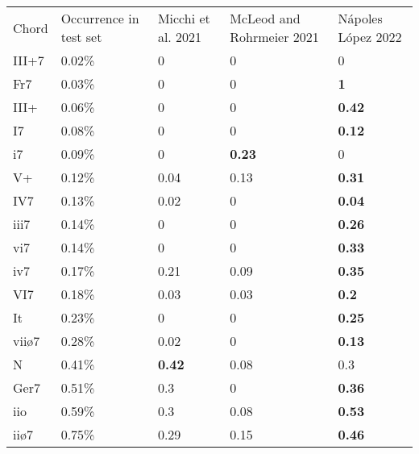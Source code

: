 \begin{tabular}{lllll}
Chord & Occurrence in test set & Micchi et al. 2021 & McLeod and Rohrmeier 2021 & Nápoles López 2022 \\
III+7 & 0.02\%                 & 0                  & 0                         & 0                  \\
Fr7   & 0.03\%                 & 0                  & 0                         & \textbf{1}         \\
III+  & 0.06\%                 & 0                  & 0                         & \textbf{0.42}      \\
I7    & 0.08\%                 & 0                  & 0                         & \textbf{0.12}      \\
i7    & 0.09\%                 & 0                  & \textbf{0.23}             & 0                  \\
V+    & 0.12\%                 & 0.04               & 0.13                      & \textbf{0.31}      \\
IV7   & 0.13\%                 & 0.02               & 0                         & \textbf{0.04}      \\
iii7  & 0.14\%                 & 0                  & 0                         & \textbf{0.26}      \\
vi7   & 0.14\%                 & 0                  & 0                         & \textbf{0.33}      \\
iv7   & 0.17\%                 & 0.21               & 0.09                      & \textbf{0.35}      \\
VI7   & 0.18\%                 & 0.03               & 0.03                      & \textbf{0.2}       \\
It    & 0.23\%                 & 0                  & 0                         & \textbf{0.25}      \\
viiø7 & 0.28\%                 & 0.02               & 0                         & \textbf{0.13}      \\
N     & 0.41\%                 & \textbf{0.42}      & 0.08                      & 0.3                \\
Ger7  & 0.51\%                 & 0.3                & 0                         & \textbf{0.36}      \\
iio   & 0.59\%                 & 0.3                & 0.08                      & \textbf{0.53}      \\
iiø7  & 0.75\%                 & 0.29               & 0.15                      & \textbf{0.46}      \\

\end{tabular}
